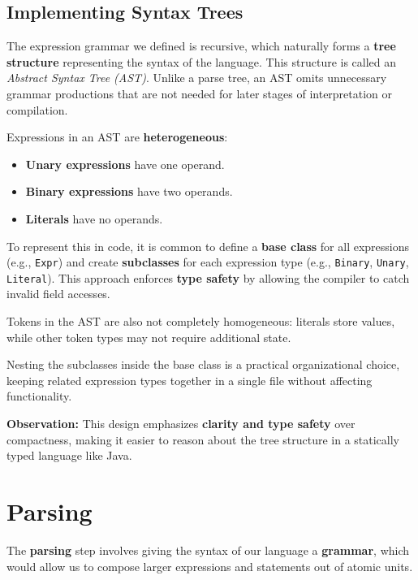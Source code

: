 \documentclass[12pt,a4paper]{article}
\newcommand{\newpar} {
  \vspace{1em}
  \noindent
}
\begin{document}
\subsection{Implementing Syntax Trees}
The expression grammar we defined is recursive, which naturally forms a \textbf{tree structure} representing the syntax of the language.
This structure is called an \emph{Abstract Syntax Tree (AST)}. Unlike a parse tree, an AST omits unnecessary grammar productions
that are not needed for later stages of interpretation or compilation.

\newpar
Expressions in an AST are \textbf{heterogeneous}:
\begin{itemize}
	\item \textbf{Unary expressions} have one operand.
	\item \textbf{Binary expressions} have two operands.
	\item \textbf{Literals} have no operands.
\end{itemize}

\newpar
To represent this in code, it is common to define a \textbf{base class} for all expressions (e.g., \texttt{Expr}) and create
\textbf{subclasses} for each expression type (e.g., \texttt{Binary}, \texttt{Unary}, \texttt{Literal}). This approach enforces
\textbf{type safety} by allowing the compiler to catch invalid field accesses.

\newpar
Tokens in the AST are also not completely homogeneous: literals store values, while other token types may not require additional state.

\newpar
Nesting the subclasses inside the base class is a practical organizational choice, keeping related expression types together in a
single file without affecting functionality.

\newpar
\textbf{Observation:} This design emphasizes \textbf{clarity and type safety} over compactness, making it easier to reason about
the tree structure in a statically typed language like Java.


\section{Parsing}

The \textbf{parsing} step involves giving the syntax of our language a \textbf{grammar}, which would allow us to compose
larger expressions and statements out of atomic units.
\end{document}
